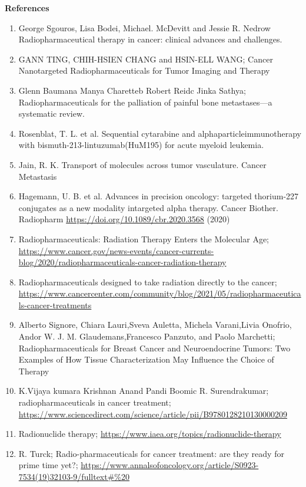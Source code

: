 \documentclass[
]{article}
\begin{document}
\textbf{References}

\begin{enumerate}
\def\labelenumi{\arabic{enumi}.}
\item
  George Sgouros, Lisa Bodei, Michael. McDevitt and Jessie R. Nedrow
  Radiopharmaceutical therapy in cancer: clinical advances and
  challenges.
\item
  GANN TING, CHIH-HSIEN CHANG and HSIN-ELL WANG; Cancer Nanotargeted
  Radiopharmaceuticals for Tumor Imaging and Therapy
\item
  Glenn Baumana Manya Charetteb Robert Reidc Jinka Sathya;
  Radiopharmaceuticals for the palliation of painful bone metastases---a
  systematic review.
\item
  Rosenblat, T. L. et al. Sequential cytarabine and
  alphaparticleimmunotherapy with bismuth-213-lintuzumab(HuM195) for
  acute myeloid leukemia.
\item
  Jain, R. K. Transport of molecules across tumor vasculature. Cancer
  Metastasis
\item
  Hagemann, U. B. et al. Advances in precision oncology: targeted
  thorium-227 conjugates as a new modality intargeted alpha therapy.
  Cancer Biother. Radiopharm \url{https://doi.org/10.1089/cbr.2020.3568}
  (2020)
\item
  Radiopharmaceuticals: Radiation Therapy Enters the Molecular Age;
  \url{https://www.cancer.gov/news-events/cancer-currents-blog/2020/radiopharmaceuticals-cancer-radiation-therapy}
\item
  Radiopharmaceuticals designed to take radiation directly to the
  cancer;
  \url{https://www.cancercenter.com/community/blog/2021/05/radiopharmaceuticals-cancer-treatments}
\item
  Alberto Signore, Chiara Lauri,Sveva Auletta, Michela Varani,Livia
  Onofrio, Andor W. J. M. Glaudemans,Francesco Panzuto, and Paolo
  Marchetti; Radiopharmaceuticals for Breast Cancer and Neuroendocrine
  Tumors: Two Examples of How Tissue Characterization May Influence the
  Choice of Therapy
\item
  K.Vijaya kumara Krishnan Anand Pandi Boomic R. Surendrakumar;
  radiopharmaceuticals in cancer treatment;
  \url{https://www.sciencedirect.com/science/article/pii/B9780128210130000209}
\item
  Radionuclide therapy;
  \url{https://www.iaea.org/topics/radionuclide-therapy}
\item
  R. Turck; Radio-pharmaceuticals for cancer treatment: are they ready
  for prime time yet?;
  \url{https://www.annalsofoncology.org/article/S0923-7534(19)32103-9/fulltext\#\%20}
\end{enumerate}
\end{document}
